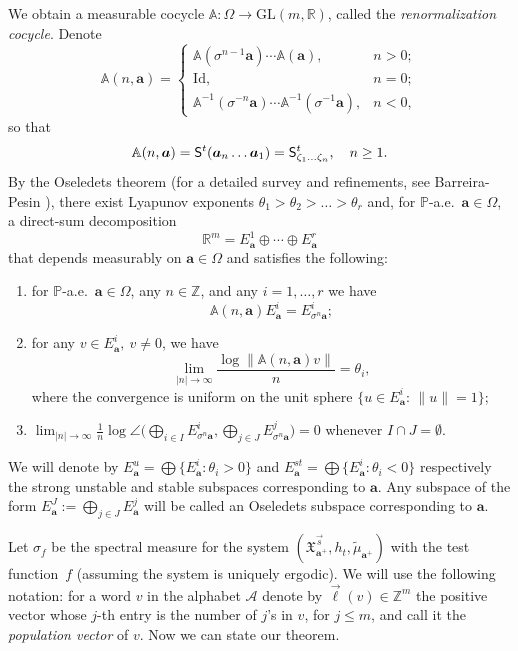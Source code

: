 \documentclass[JEP,XML,SOM,Unicode]{cedram}
\let\mathcal\mathscr
\newenvironment{enumeratei}
{\bgroup\def\theenumi{\roman{enumi}}\def\theenumii{\arabic{enumii}}\begin{enumerate}}
{\end{enumerate}\egroup}
\newcommand{\Id}{\mathrm{Id}}
\newcommand{\GL}{\mathrm{GL}}
\theoremstyle{plain}
\theoremstyle{definition}
\let\wt\widetilde
\newcommand\bom{{\boldsymbol a}}\let\ba\bom
\let\es\emptyset
\let\Om\Omega
\let\sig\sigma
\newcommand\Xx{\mathfrak{X}}
\newcommand\Ak{\mathcal{A}}
\newcommand\Aa{\mathbb{A}}
\newcommand{\R}{\mathbb{R}}
\newcommand{\Z}{\mathbb{Z}}
\renewcommand{\P}{\mathbb{P}}
\newcommand\Sf{{\sf S}}
\newcommand\be{\begin{equation}}
\newcommand\ee{\end{equation}}
\begin{document}
We obtain a measurable cocycle $\Aa: \Om\to \GL(m,\R)$, called the \emph{renormalization cocycle}. Denote\vspace*{-3pt}
\begin{equation}\label{renormcoc}
\Aa(n,\bom) = \begin{cases} \Aa(\sig^{n-1}\bom)\cdots \Aa(\bom), & n> 0; \\
\Id, & n=0; \\
\Aa^{-1}(\sig^{-n}\bom) \cdots \Aa^{-1}(\sig^{-1}\bom), & n<0,\end{cases}
\end{equation}
so that\vspace*{-3pt}
\[
\Aa(n,\bom) = \Sf^t(\bom_n\ldots \bom_1)= \Sf^t_{\zeta_1\ldots\zeta_n},\quad n\ge 1.\]
By the Oseledets theorem \cite{oseledets} (for a detailed survey and refinements, see Barreira-Pesin \cite[Th.\,3.5.5]{barpes}),
there exist Lyapunov exponents $\theta_1> \theta_2 > \ldots > \theta_r$ and, for $\P$-a.e.\ $\bom\in \Om$, a direct-sum decomposition\vspace*{-3pt}
\be \label{os1}
\R^m = E^1_\bom \oplus \cdots \oplus E^r_\bom
\ee
that depends measurably on $\bom\in \Om$ and satisfies the following:
\begin{enumeratei}
\item\label{sec:3i}
for $\P$-a.e.\ $\bom\in \Om$, any $n\in\Z$, and any $i=1,\ldots,r$ we have
\[
\Aa(n,\bom) E^i_\bom = E^i_{\sig^n\bom};
\]

\item\label{sec:3ii}
for any $v\in E^i_\bom,\ v\ne 0$, we have
\[
\lim_{|n|\to \infty} \frac{\log\|\Aa(n,\bom)v\|}{n} = \theta_i,
\]
where the convergence is uniform on the unit sphere $\{u\in E^i_\bom:\, \|u\|=1\}$;

\item\label{sec:3iii}
$\lim_{|n|\to \infty} \frac{1}{n}\log\angle\bigl(\bigoplus_{i\in I} E^i_{\sig^n\bom}, \bigoplus_{j\in J} E^j_{\sig^n \bom} \bigr) =0$ whenever $I\cap J = \es$.
\end{enumeratei}

We will denote by $E_\bom^{u}=\bigoplus\{E^i_\bom:\theta_i>0\}$ and $E_\bom^{st}=\bigoplus\{E^i_\bom:\theta_i<0\}$ respectively the strong unstable and stable subspaces corresponding to $\bom$. Any subspace of the form $E_\bom^J:=\bigoplus_{j\in J} E^j_\bom$ will be called an Oseledets subspace corresponding to $\bom$.

Let $\sig_f$ be the spectral measure for the system $(\Xx_{\bom^+}^{\vec{s}},h_t,\wt\mu_{\bom^+})$ with the test function~$f$ (assuming the system is uniquely ergodic).
We will use the following notation: for a word $v$ in the alphabet $\Ak$ denote by $\vec{\ell}(v)\in \Z^m$ the positive vector whose $j$-th entry is the number of $j$'s in $v$, for $j\le m$,
and call it the \emph{population vector} of $v$.
Now we can state our theorem.
\end{document}
